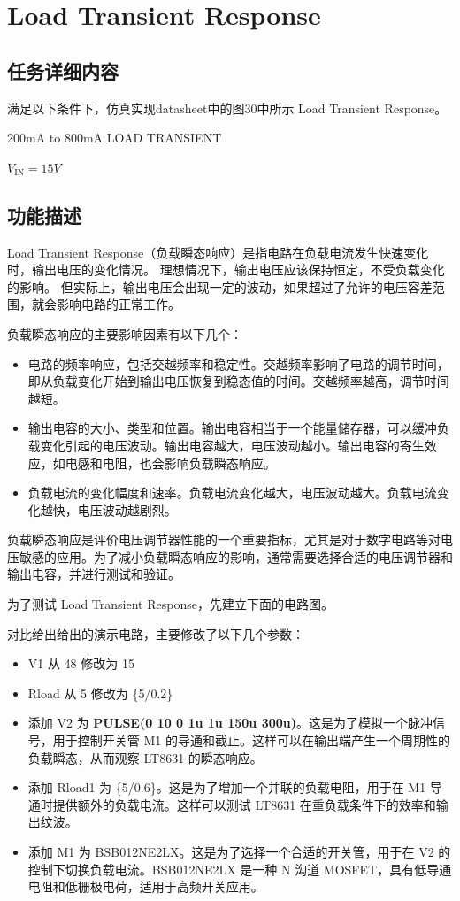 \documentclass[lang=cn,10pt]{elegantbook}
\begin{document}
\section{Load Transient Response}

\subsection{任务详细内容}

满足以下条件下，仿真实现datasheet中的图30中所示 Load Transient Response。

200mA to 800mA LOAD TRANSIENT

$V_{\text{IN}} = 15V$

\subsection{功能描述}

Load Transient Response（负载瞬态响应）是指电路在负载电流发生快速变化时，输出电压的变化情况。
理想情况下，输出电压应该保持恒定，不受负载变化的影响。
但实际上，输出电压会出现一定的波动，如果超过了允许的电压容差范围，就会影响电路的正常工作。

负载瞬态响应的主要影响因素有以下几个：

\begin{itemize}
    \item 电路的频率响应，包括交越频率和稳定性。交越频率影响了电路的调节时间，即从负载变化开始到输出电压恢复到稳态值的时间。交越频率越高，调节时间越短。
    \item 输出电容的大小、类型和位置。输出电容相当于一个能量储存器，可以缓冲负载变化引起的电压波动。输出电容越大，电压波动越小。输出电容的寄生效应，如电感和电阻，也会影响负载瞬态响应。
    \item 负载电流的变化幅度和速率。负载电流变化越大，电压波动越大。负载电流变化越快，电压波动越剧烈。
\end{itemize}

负载瞬态响应是评价电压调节器性能的一个重要指标，尤其是对于数字电路等对电压敏感的应用。为了减小负载瞬态响应的影响，通常需要选择合适的电压调节器和输出电容，并进行测试和验证。

为了测试 Load Transient Response，先建立下面的电路图。

对比给出给出的演示电路，主要修改了以下几个参数：

\begin{itemize}
    \item V1 从 48 修改为 15
    \item Rload 从 5 修改为 \{5/0.2\}
    \item 添加 V2 为 \textbf{PULSE(0 10 0 1u 1u 150u 300u)}。这是为了模拟一个脉冲信号，用于控制开关管 M1 的导通和截止。这样可以在输出端产生一个周期性的负载瞬态，从而观察 LT8631 的瞬态响应。
    \item 添加 Rload1 为 \{5/0.6\}。这是为了增加一个并联的负载电阻，用于在 M1 导通时提供额外的负载电流。这样可以测试 LT8631 在重负载条件下的效率和输出纹波。 
    \item 添加 M1 为 BSB012NE2LX。这是为了选择一个合适的开关管，用于在 V2 的控制下切换负载电流。BSB012NE2LX 是一种 N 沟道 MOSFET，具有低导通电阻和低栅极电荷，适用于高频开关应用。
\end{itemize}
\end{document}
